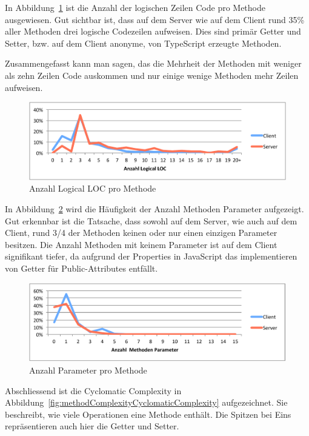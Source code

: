 	In Abbildung\ \ref{fig:methodComplexityLLOC} ist die Anzahl der logischen Zeilen Code pro Methode ausgewiesen.
	Gut sichtbar ist, dass auf dem Server wie auf dem Client rund 35\% aller Methoden drei logische Codezeilen aufweisen.
	Dies sind primär Getter und Setter, bzw. auf dem Client anonyme, von TypeScript erzeugte Methoden.
	
	Zusammengefasst kann man sagen, das die Mehrheit der Methoden mit weniger als zehn Zeilen Code auskommen und nur einige wenige Methoden mehr Zeilen aufweisen.
	
	\begin{figure}[H]
		\includegraphics[width=\textwidth]{projectPlan/media/img/methodComplexityLLOC.pdf}
		\centering
		\caption{Anzahl Logical LOC pro Methode}
		\label{fig:methodComplexityLLOC}
	\end{figure}
	
	In Abbildung\ \ref{fig:methodComplexityParameterCount} wird die Häufigkeit der Anzahl Methoden Parameter aufgezeigt.
	Gut erkennbar ist die Tatsache, dass sowohl auf dem Server, wie auch auf dem Client,
	rund 3/4 der Methoden keinen oder nur einen einzigen Parameter besitzen.
	Die Anzahl Methoden mit keinem Parameter ist auf dem Client signifikant tiefer, da aufgrund der Properties in JavaScript das implementieren von Getter für Public-Attributes entfällt.
	
	
	\begin{figure}[H]
		\includegraphics[width=\textwidth]{projectPlan/media/img/methodComplexityParameterCount.pdf}
		\centering
		\caption{Anzahl Parameter pro Methode}
		\label{fig:methodComplexityParameterCount}
	\end{figure}
	Abschliessend ist die Cyclomatic Complexity in Abbildung\ \ref{fig:methodComplexityCyclomaticComplexity} aufgezeichnet.  
	Sie beschreibt, wie viele Operationen eine Methode enthält.
	Die Spitzen bei Eins repräsentieren auch hier die Getter und Setter.
	
